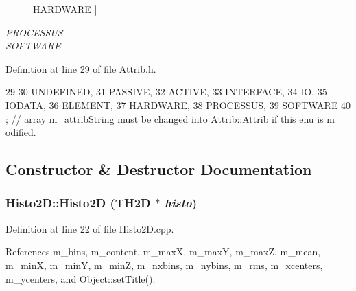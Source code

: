 \begin{Desc}
\begin{description}
{\hypertarget{classAttrib_a69e171d7cc6417835a5a306d3c764235a61ceb22149f365f1780d18f9d1459423}{
HARDWARE}
\label{classAttrib_a69e171d7cc6417835a5a306d3c764235a61ceb22149f365f1780d18f9d1459423}
}]\item[{\em 
\hypertarget{classAttrib_a69e171d7cc6417835a5a306d3c764235a75250e29692496e73effca2c0330977f}{
PROCESSUS}
\label{classAttrib_a69e171d7cc6417835a5a306d3c764235a75250e29692496e73effca2c0330977f}
}]\item[{\em 
\hypertarget{classAttrib_a69e171d7cc6417835a5a306d3c764235a103a67cd0b8f07ef478fa45d4356e27b}{
SOFTWARE}
\label{classAttrib_a69e171d7cc6417835a5a306d3c764235a103a67cd0b8f07ef478fa45d4356e27b}
}]\end{description}
\end{Desc}



Definition at line 29 of file Attrib.h.


\begin{DoxyCode}
29                 {
30     UNDEFINED,
31     PASSIVE,
32     ACTIVE,
33     INTERFACE,
34     IO,
35     IODATA,
36     ELEMENT,
37     HARDWARE,
38     PROCESSUS,
39     SOFTWARE 
40   }; // array m_attribString must be changed into Attrib::Attrib if this enu is m
      odified. 
\end{DoxyCode}


\subsection{Constructor \& Destructor Documentation}
\hypertarget{classHisto2D_acdeb6b732d7b596dea8a282813cd1c18}{
\subsubsection[{Histo2D}]{\setlength{\rightskip}{0pt plus 5cm}Histo2D::Histo2D (TH2D $\ast$ {\em histo})}}
\label{classHisto2D_acdeb6b732d7b596dea8a282813cd1c18}


Definition at line 22 of file Histo2D.cpp.

References m\_\-bins, m\_\-content, m\_\-maxX, m\_\-maxY, m\_\-maxZ, m\_\-mean, m\_\-minX, m\_\-minY, m\_\-minZ, m\_\-nxbins, m\_\-nybins, m\_\-rms, m\_\-xcenters, m\_\-ycenters, and Object::setTitle().


